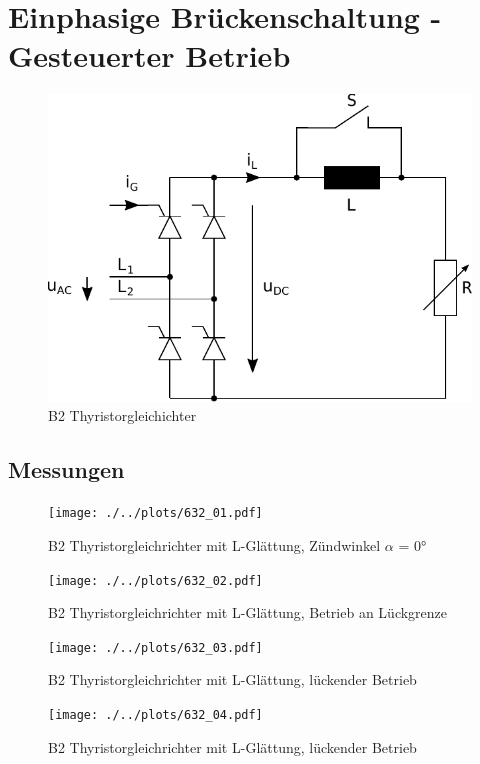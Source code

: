 \section{Einphasige Brückenschaltung - Gesteuerter Betrieb}

\begin{figure}[h!]
    \centering
    \includegraphics[scale=\sscale]{./../fig/b2_thyristor.pdf}
    \caption{B2 Thyristorgleichichter}
    \label{fig:b2_tyristor}
\end{figure}

\subsection{Messungen}

\begin{figure}[h!]
    \centering
    \texttt{[image: ./../plots/632\_01.pdf]}
    \caption{B2 Thyristorgleichrichter mit L-Glättung, Zündwinkel $\alpha$ = 0°}
\end{figure}

\begin{figure}[h!]
    \centering
    \texttt{[image: ./../plots/632\_02.pdf]}
    \caption{B2 Thyristorgleichrichter mit L-Glättung, Betrieb an Lückgrenze}
\end{figure}

\begin{figure}[h!]
    \centering
    \texttt{[image: ./../plots/632\_03.pdf]}
    \caption{B2 Thyristorgleichrichter mit L-Glättung, lückender Betrieb}
\end{figure}

\begin{figure}[h!]
    \centering
    \texttt{[image: ./../plots/632\_04.pdf]}
    \caption{B2 Thyristorgleichrichter mit L-Glättung, lückender Betrieb}
\end{figure}

